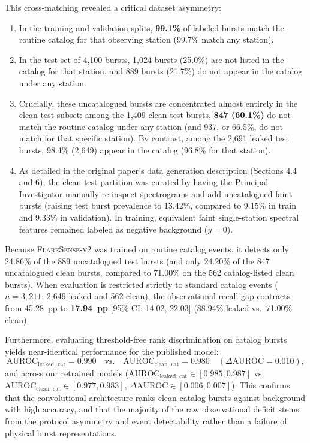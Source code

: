 \documentclass[11pt,a4paper]{article}
\begin{document}
This cross-matching revealed a critical dataset asymmetry:
\begin{enumerate}
    \item In the training and validation splits, \textbf{99.1\%} of labeled bursts match the routine catalog for that observing station (99.7\% match any station).
    \item In the test set of 4,100 bursts, 1,024 bursts (25.0\%) are not listed in the catalog for that station, and 889 bursts (21.7\%) do not appear in the catalog under any station.
    \item Crucially, these uncatalogued bursts are concentrated almost entirely in the clean test subset: among the 1,409 clean test bursts, \textbf{847 (60.1\%)} do not match the routine catalog under any station (and 937, or 66.5\%, do not match for that specific station). By contrast, among the 2,691 leaked test bursts, 98.4\% (2,649) appear in the catalog (96.8\% for that station).
    \item As detailed in the original paper's data generation description (Sections 4.4 and 6), the clean test partition was curated by having the Principal Investigator manually re-inspect spectrograms and add uncatalogued faint bursts (raising test burst prevalence to 13.42\%, compared to 9.15\% in train and 9.33\% in validation). In training, equivalent faint single-station spectral features remained labeled as negative background ($y=0$).
\end{enumerate}

Because \textsc{FlareSense-v2} was trained on routine catalog events, it detects only 24.86\% of the 889 uncatalogued test bursts (and only 24.20\% of the 847 uncatalogued clean bursts, compared to 71.00\% on the 562 catalog-listed clean bursts). When evaluation is restricted strictly to standard catalog events ($n=3,211$: 2,649 leaked and 562 clean), the observational recall gap contracts from 45.28~pp to \textbf{17.94~pp} [95\% CI: 14.02, 22.03] (88.94\% leaked vs.\ 71.00\% clean).

Furthermore, evaluating threshold-free rank discrimination on catalog bursts yields near-identical performance for the published model:
\begin{equation}
\text{AUROC}_{\text{leaked, cat}} = 0.990 \quad \text{vs.} \quad \text{AUROC}_{\text{clean, cat}} = 0.980 \quad (\Delta\text{AUROC} = 0.010),
\end{equation}
and across our retrained models ($\text{AUROC}_{\text{leaked, cat}} \in [0.985, 0.987]$ vs.\ $\text{AUROC}_{\text{clean, cat}} \in [0.977, 0.983]$, $\Delta\text{AUROC} \in [0.006, 0.007]$). This confirms that the convolutional architecture ranks clean catalog bursts against background with high accuracy, and that the majority of the raw observational deficit stems from the protocol asymmetry and event detectability rather than a failure of physical burst representations.
\end{document}
